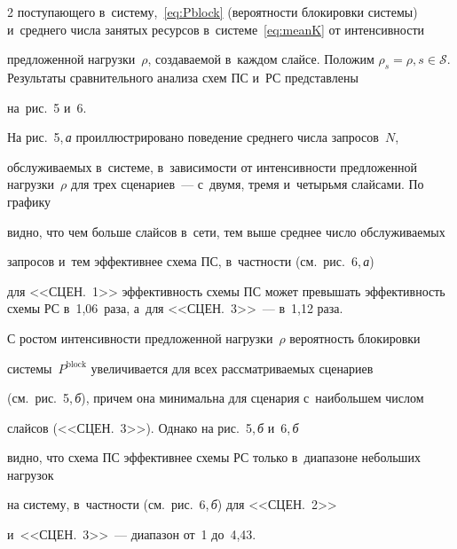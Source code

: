 \begin{multicols}{2}
поступающего в~сис\-те\-му,~\eqref{eq:Pblock} (вероятности блокировки сис\-те\-мы) и~среднего чис\-ла занятых ресурсов в~сис\-те\-ме~\eqref{eq:meanK} от \mbox{интенсивности} 


предложенной нагрузки~$\rho$, созда\-ва\-емой в~каж\-дом слайсе. Положим $\rho_s=\rho, 


s\in\mathcal{S}$. Результаты сравнительного анализа схем ПС и~РС представлены 


на~рис.~5 и~6.














На рис.~5,\,\textit{а} проиллюстрировано поведение среднего числа запросов~$N$, 


об\-слу\-жи\-ва\-емых в~сис\-те\-ме, в~за\-ви\-си\-мости от интенсивности предложенной нагрузки~$\rho$ для трех сценариев~--- с~двумя, тремя и~четырьмя слайсами. По графику 


видно, что чем больше слайсов в~сети, тем выше сред\-нее чис\-ло об\-слу\-жи\-ва\-емых 


запросов и~тем эф\-фек\-тив\-нее схема ПС, в~част\-ности (см.\ рис.~6,\,\textit{а}) 


для <<СЦЕН.~1>> эф\-фек\-тив\-ность схемы ПС может превышать эф\-фек\-тив\-ность схемы РС в~1,06~раза, а~для <<СЦЕН.~3>>~--- в~1,12 раза.











С ростом интенсивности предложенной нагрузки~$\rho$ вероятность блокировки 


системы~$P^{\mathrm{block}}$ увеличивается для всех рассматриваемых сценариев 


(см.\ рис.~5,\,\textit{б}), причем она минимальна для сценария с~наибольшем числом 


слайсов (<<СЦЕН.~3>>). Однако на рис.~5,\,\textit{б} и~6,\,\textit{б} 


видно, что схема ПС эффективнее схемы РС только в~диапазоне небольших нагрузок 


на сис\-те\-му, в~част\-ности (см.\ рис.~6,\,\textit{б}) для <<СЦЕН.~2>> 


и~<<СЦЕН.~3>>~--- диапазон от~1 до~4,43.












\end{multicols}
